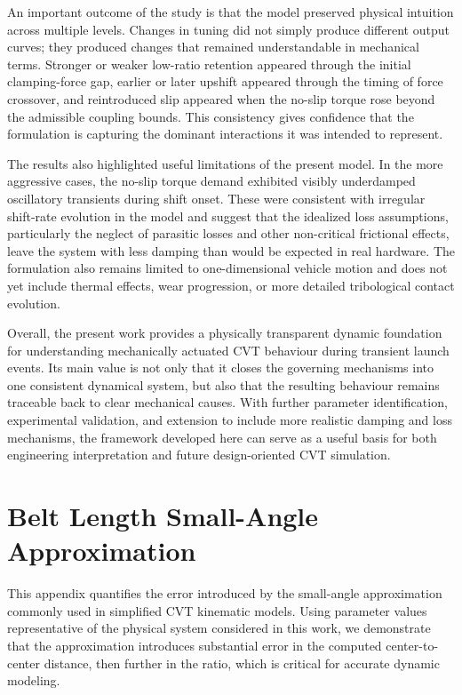 \documentclass[11pt]{article}
\numberwithin{equation}{section}
\newcounter{assump}
\begin{document}
An important outcome of the study is that the model preserved physical
intuition across multiple levels. Changes in tuning did not simply produce
different output curves; they produced changes that remained understandable in
mechanical terms. Stronger or weaker low-ratio retention appeared through the
initial clamping-force gap, earlier or later upshift appeared through the
timing of force crossover, and reintroduced slip appeared when the no-slip
torque rose beyond the admissible coupling bounds. This consistency gives
confidence that the formulation is capturing the dominant interactions it was
intended to represent.

The results also highlighted useful limitations of the present model. In the
more aggressive cases, the no-slip torque demand exhibited visibly underdamped
oscillatory transients during shift onset. These were consistent with
irregular shift-rate evolution in the model and suggest that the idealized loss
assumptions, particularly the neglect of parasitic losses and other
non-critical frictional effects, leave the system with less damping than would
be expected in real hardware. The formulation also remains limited to
one-dimensional vehicle motion and does not yet include thermal effects, wear
progression, or more detailed tribological contact evolution.

Overall, the present work provides a physically transparent dynamic foundation
for understanding mechanically actuated CVT behaviour during transient launch
events. Its main value is not only that it closes the governing mechanisms into
one consistent dynamical system, but also that the resulting behaviour remains
traceable back to clear mechanical causes. With further parameter
identification, experimental validation, and extension to include more
realistic damping and loss mechanisms, the framework developed here can serve
as a useful basis for both engineering interpretation and future
design-oriented CVT simulation.

\appendix
\section{Belt Length Small-Angle Approximation}\label{sec:approximation-validation}

This appendix quantifies the error introduced by the small-angle approximation
commonly used in simplified CVT kinematic models. Using parameter values
representative of the physical system considered in this work, we demonstrate
that the approximation introduces substantial error in the computed
center-to-center distance, then further in the ratio, which is critical for accurate dynamic modeling.
\end{document}
